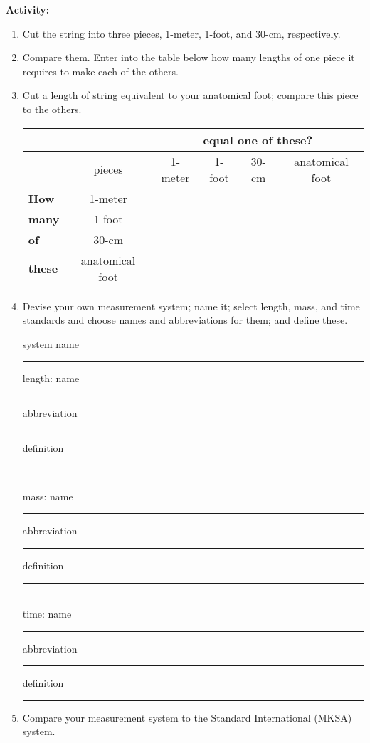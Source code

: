 {\noindent \bf Activity:} \begin{enumerate}

\item Cut the string into three pieces, 1-meter, 1-foot, and 30-cm, respectively.

\item Compare them. Enter into the table below how many lengths of one piece it requires to make each of the others.

\item Cut a length of string equivalent to your anatomical foot; compare this piece to the others.

\begin{center} \begin{tabular}{|l|c|c|c|c|c|} \hline \multicolumn{2}{|c||}{} & \multicolumn{4}{c|}{\bf equal one of these?} \\ \hline \multicolumn{1}{|c}{}& \multicolumn{1}{c||}{pieces}& 1-meter &1-foot & 30-cm & anatomical foot \\ \hline \hline {\bf How} & \multicolumn{1}{c||}{1-meter} &&&& \\ \cline{2-6} {\bf many} & \multicolumn{1}{c||}{1-foot} &&&& \\ \cline{2-6} {\bf of} & \multicolumn{1}{c||}{30-cm} &&&& \\ \cline{2-6} {\bf these} & \multicolumn{1}{c||}{anatomical foot} &&&& \\ \hline \end{tabular} \end{center}

\item Devise your own measurement system; name it; select length, mass, and time standards and choose names and abbreviations for them; and define these.

\begin{center} system name \rule{3in}{0.2pt} \end{center} \begin{tabbing} length: \= name \rule{1in}{0.2pt} \= abbreviation \rule{0.5in}{0.2pt} \= definition \rule{1.5in}{0.2pt} \\ mass: \> name \rule{1in}{0.2pt} \> abbreviation \rule{0.5in}{0.2pt} \> definition \rule{1.5in}{0.2pt} \\ time: \> name \rule{1in}{0.2pt} \> abbreviation \rule{0.5in}{0.2pt} \> definition \rule{1.5in}{0.2pt} \end{tabbing}

\item Compare your measurement system to the Standard International (MKSA) system.


\end{enumerate}
